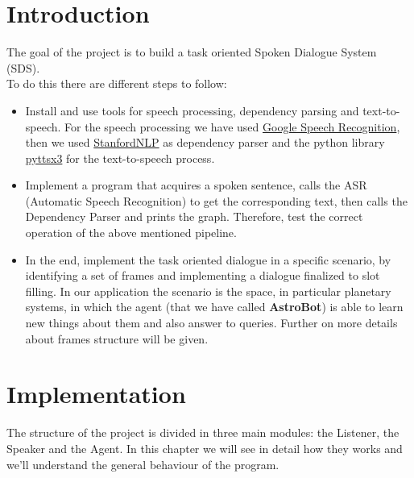 \documentclass[12pt, a4paper]{article}
\begin{document}
\section{Introduction}\label{1}
The goal of the project is to build a task oriented Spoken Dialogue System (SDS).
\\To do this there are different steps to follow:
\begin{itemize}
\item Install and use tools for speech processing, dependency parsing and text-to-speech.
For the speech processing we have used \href{https://pypi.org/project/SpeechRecognition/}{Google Speech Recognition}, then we used \href{https://stanfordnlp.github.io/stanfordnlp/}{StanfordNLP} as dependency parser and the python library \href{https://pypi.org/project/pyttsx3/}{pyttsx3} for the text-to-speech process.
\item Implement a program that acquires a spoken sentence, calls the ASR (Automatic Speech Recognition) to get the corresponding text, then calls the Dependency Parser and prints the graph. Therefore, test the correct operation of the above mentioned pipeline.
\item In the end, implement the task oriented dialogue in a specific scenario, by identifying a set of frames and implementing a dialogue finalized to slot filling. In our application the scenario is the space, in particular planetary systems, in which the agent (that we have called \textbf{AstroBot}) is able to learn new things about them and also answer to queries. Further on more details about frames structure will be given.
\end{itemize}
\section{Implementation}\label{2}
The structure of the project is divided in three main modules: the Listener, the Speaker and the Agent.
In this chapter we will see in detail how they works and we'll understand the general behaviour of the program.
\end{document}
